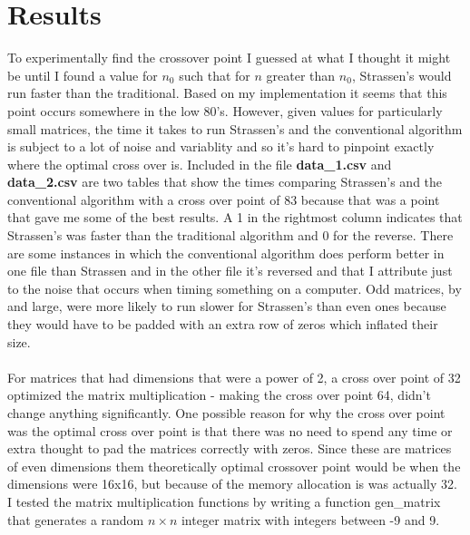 \documentclass{article}
\begin{document}
\section{Results}
To experimentally find the crossover point I guessed at what I thought it might be until I found a value for $n_0$ such that for $n$ greater than $n_0$, Strassen's would run faster than the traditional.  Based on my implementation it seems that this point occurs somewhere in the low 80's.  However, given values for particularly small matrices, the time it takes to run Strassen's and the conventional algorithm is subject to a lot of noise and variablity and so it's hard to pinpoint exactly where the optimal cross over is.  Included in the file \textbf{data\_1.csv} and \textbf{data\_2.csv} are two tables that show the times comparing Strassen's and the conventional algorithm with a cross over point of 83 because that was a point that gave me some of the best results.  A 1 in the rightmost column indicates that Strassen's was faster than the traditional algorithm and 0 for the reverse. There are some instances in which the conventional algorithm does perform better in one file than Strassen and in the other file it's reversed and that I attribute just to the noise that occurs when timing something on a computer.  Odd matrices, by and large, were more likely to run slower for Strassen's than even ones because they would have to be padded with an extra row of zeros which inflated their size.  \\\\
\noindent
For matrices that had dimensions that were a power of 2, a cross over point of 32 optimized the matrix multiplication - making the cross over point 64, didn't change anything significantly. One possible reason for why the cross over point was the optimal cross over point is that there was no need to spend any time or extra thought to pad the matrices correctly with zeros. Since these are matrices of even dimensions them theoretically optimal crossover point would be when the dimensions were 16x16, but because of the memory allocation is was actually 32.   I tested the matrix multiplication functions by writing a function gen\_matrix that generates a random $n\times n$ integer matrix with integers between -9 and 9.  \\\\
\end{document}

